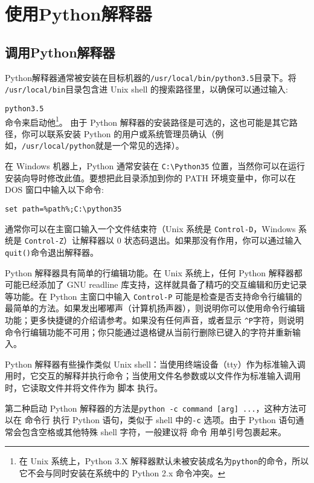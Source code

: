 \chapter{使用Python解释器\label{Interpreter}}
\section{调用Python解释器}
Python解释器通常被安装在目标机器的\texttt{/usr/local/bin/python3.5}目录下。将 \texttt{/usr/local/bin}目录包含进 Unix shell 的搜索路径里，以确保可以通过输入:

\verb|python3.5|\\
命令来启动他\footnote{在 Unix 系统上，Python 3.X 解释器默认未被安装成名为\texttt{python}的命令，所以它不会与同时安装在系统中的 Python 2.x 命令冲突。}。 由于 Python 解释器的安装路径是可选的，这也可能是其它路径，你可以联系安装 Python 的用户或系统管理员确认（例如，\texttt{/usr/local/python}就是一个常见的选择）。

在 Windows 机器上，Python 通常安装在 \texttt{C:\textbackslash{}Python35} 位置，当然你可以在运行安装向导时修改此值。要想把此目录添加到你的 PATH 环境变量中，你可以在 DOS 窗口中输入以下命令:

\texttt{set path=\%path\%;C:\textbackslash{}python35}

通常你可以在主窗口输入一个文件结束符（Unix 系统是 \texttt{Control-D}，Windows 系统是 \texttt{Control-Z}）让解释器以 0 状态码退出。如果那没有作用，你可以通过输入\texttt{quit()}命令退出解释器。

Python 解释器具有简单的行编辑功能。在 Unix 系统上，任何 Python 解释器都可能已经添加了 GNU readline 库支持，这样就具备了精巧的交互编辑和历史记录等功能。在 Python 主窗口中输入 \texttt{Control-P} 可能是检查是否支持命令行编辑的最简单的方法。如果发出嘟嘟声（计算机扬声器），则说明你可以使用命令行编辑功能；更多快捷键的介绍请参考。如果没有任何声音，或者显示 \texttt{\^{}P}字符，则说明命令行编辑功能不可用；你只能通过退格键从当前行删除已键入的字符并重新输入。

Python 解释器有些操作类似 Unix shell：当使用终端设备（tty）作为标准输入调用时，它交互的解释并执行命令；当使用文件名参数或以文件作为标准输入调用时，它读取文件并将文件作为 脚本 执行。

第二种启动 Python 解释器的方法是\texttt{python -c command [arg] ...}，这种方法可以在 命令行 执行 Python 语句，类似于 shell 中的\texttt{-c} 选项。由于 Python 语句通常会包含空格或其他特殊 shell 字符，一般建议将 命令 用单引号包裹起来。


